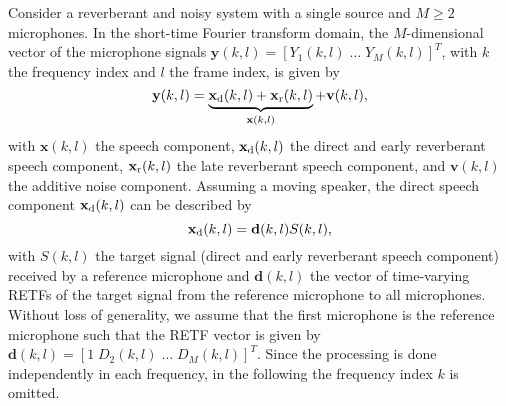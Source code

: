 \documentclass{article}
\begin{document}
Consider a reverberant and noisy system with a single source and $M \geq 2$ microphones.
In the short-time Fourier transform domain, the $M$-dimensional vector of the microphone signals $\mathbf{y}(k,l) = [Y_1(k,l) \; \ldots \; Y_M(k,l)]^T$, with $k$ the frequency index and $l$ the frame index, is given by
\begin{equation}
  \mathbf{y}(k,l)  = \underbrace{\mathbf{x}_{\rm d}(k,l) + \mathbf{x}_{\rm r}(k,l)}_{\mathbf{x}(k,l)} + \mathbf{v}(k,l),
\end{equation}
with $\mathbf{x}(k,l)$ the speech component, $\mathbf{x}_{\rm d}(k,l)$ the direct and early reverberant speech component, $\mathbf{x}_{\rm r}(k,l)$ the late reverberant speech component, and $\mathbf{v}(k,l)$ the additive noise component.
Assuming a moving speaker, the direct speech component $\mathbf{x}_{\rm d}(k,l)$ can be described by
\begin{equation}
  \label{eq: retfs}
\mathbf{x}_{\rm d}(k,l) = \mathbf{d}(k,l)S(k,l),
\end{equation}
with $S(k,l)$ the target signal (direct and early reverberant speech component) received by a reference microphone and $\mathbf{d}(k,l)$ the vector of time-varying RETFs of the target signal from the reference microphone to all microphones.
Without loss of generality, we assume that the first microphone is the reference microphone such that the RETF vector is given by $\mathbf{d}(k,l) = [1 \; D_2(k,l) \; \ldots \; D_M(k,l)]^T$. 
Since the processing is done independently in each frequency, in the following the frequency index $k$ is omitted.
\end{document}
